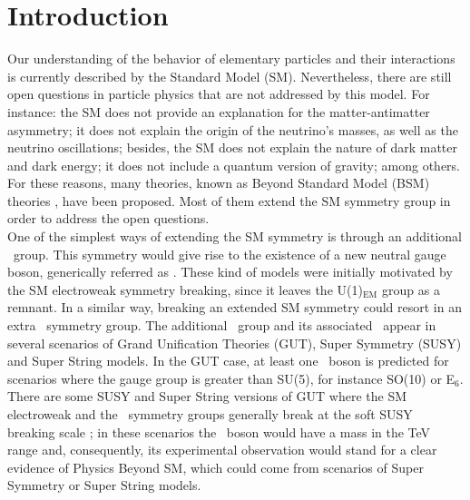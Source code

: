 \chapter*{Introduction}

Our understanding of the behavior of elementary particles and their interactions is 
currently described by the Standard Model (SM). Nevertheless, there are still open 
questions in particle physics that are not addressed by this model. For instance: the SM does 
not provide an explanation for the matter-antimatter asymmetry; it does not 
explain the origin of the neutrino's masses, as well as the 
neutrino oscillations; besides, the SM does not explain the nature of dark matter and dark energy;
it does not include a quantum version of gravity; among others. For these reasons, 
many theories, known as Beyond Standard Model (BSM) theories \cite{BSM}, have been proposed.
Most of them extend the SM symmetry group in order to address the open questions. \\

\noindent One of the simplest ways of extending the SM symmetry is through an additional
\Uprime~group. This symmetry would give rise to the existence of a new neutral gauge boson, generically 
referred as \Zprime. These kind of models were initially motivated by the 
SM electroweak symmetry breaking, since it leaves the U(1)$_{\text{EM}}$ group 
as a remnant. In a similar way, breaking an extended SM symmetry could resort 
in an extra \Uprime~symmetry group. The additional \Uprime~group and its associated
\Zprime~appear in several scenarios of Grand Unification Theories (GUT), Super Symmetry 
(SUSY) and Super String models. In the GUT case, at least one \Zprime~boson
is predicted for scenarios where the gauge group is greater than SU(5), for instance 
SO(10) or E$_{6}$. There are some SUSY and Super String versions of GUT 
where the SM electroweak and the \Uprime~symmetry groups 
generally break at the soft SUSY breaking scale \cite{Langacker:2008yv}; in these scenarios 
the \Zprime~boson would have a mass in the TeV range and, consequently, its experimental
observation would stand for a clear evidence of Physics Beyond SM, which could 
come from scenarios of Super Symmetry or Super String models. \\

